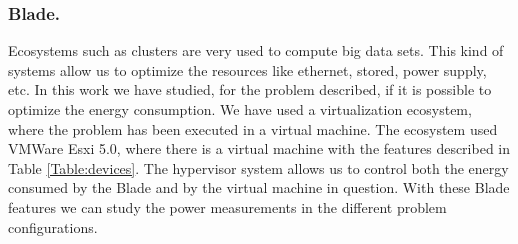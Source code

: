 \subsubsection*{Blade.}

Ecosystems such as clusters are very used to compute big data sets. This kind of systems allow us to optimize the resources like ethernet, stored, power supply, etc. In this work we have studied, for the problem described, if it is possible to optimize the energy consumption. We have used a virtualization ecosystem, where the problem has been executed in a virtual machine. The ecosystem used VMWare Esxi 5.0, where there is a virtual machine with the features described in Table \ref{Table:devices}. The hypervisor system allows us to control both the energy consumed by the Blade and by the virtual machine in question. With these Blade features we can study the power measurements in the different problem configurations.









